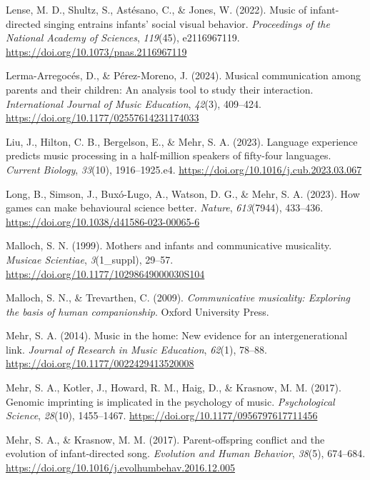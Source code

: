 \documentclass[
]{article}
\newlength{\cslhangindent}
\newenvironment{CSLReferences}[2] %
 {\begin{list}{}{%
  \setlength{\itemindent}{0pt}
  \setlength{\leftmargin}{0pt}
  \setlength{\parsep}{0pt}
  \ifodd #1
   \setlength{\leftmargin}{\cslhangindent}
   \setlength{\itemindent}{-1\cslhangindent}
  \fi
  \setlength{\itemsep}{#2\baselineskip}}}
 {\end{list}}
\begin{document}
\begin{CSLReferences}{1}{0}
Lense, M. D., Shultz, S., Astésano, C., \& Jones, W. (2022). Music of
infant-directed singing entrains infants' social visual behavior.
\emph{Proceedings of the National Academy of Sciences}, \emph{119}(45),
e2116967119. \url{https://doi.org/10.1073/pnas.2116967119}

Lerma-Arregocés, D., \& Pérez-Moreno, J. (2024). Musical communication
among parents and their children: {An} analysis tool to study their
interaction. \emph{International Journal of Music Education},
\emph{42}(3), 409--424. \url{https://doi.org/10.1177/02557614231174033}

Liu, J., Hilton, C. B., Bergelson, E., \& Mehr, S. A. (2023). Language
experience predicts music processing in a half-million speakers of
fifty-four languages. \emph{Current Biology}, \emph{33}(10),
1916--1925.e4. \url{https://doi.org/10.1016/j.cub.2023.03.067}

Long, B., Simson, J., Buxó-Lugo, A., Watson, D. G., \& Mehr, S. A.
(2023). How games can make behavioural science better. \emph{Nature},
\emph{613}(7944), 433--436.
\url{https://doi.org/10.1038/d41586-023-00065-6}

Malloch, S. N. (1999). Mothers and infants and communicative musicality.
\emph{Musicae Scientiae}, \emph{3}(1\_suppl), 29--57.
\url{https://doi.org/10.1177/10298649000030S104}

Malloch, S. N., \& Trevarthen, C. (2009). \emph{Communicative
musicality: Exploring the basis of human companionship}. Oxford
University Press.

Mehr, S. A. (2014). Music in the home: {New} evidence for an
intergenerational link. \emph{Journal of Research in Music Education},
\emph{62}(1), 78--88. \url{https://doi.org/10.1177/0022429413520008}

Mehr, S. A., Kotler, J., Howard, R. M., Haig, D., \& Krasnow, M. M.
(2017). Genomic imprinting is implicated in the psychology of music.
\emph{Psychological Science}, \emph{28}(10), 1455--1467.
\url{https://doi.org/10.1177/0956797617711456}

Mehr, S. A., \& Krasnow, M. M. (2017). Parent-offspring conflict and the
evolution of infant-directed song. \emph{Evolution and Human Behavior},
\emph{38}(5), 674--684.
\url{https://doi.org/10.1016/j.evolhumbehav.2016.12.005}


\end{CSLReferences}
\end{document}
